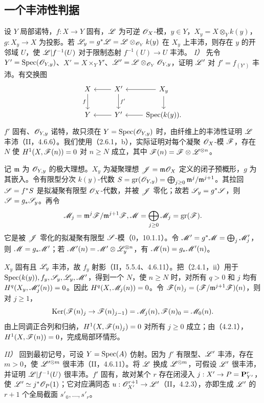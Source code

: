 \subsection{一个丰沛性判据}
设 $Y$ 局部诺特，$f:X\to Y$ 固有，$\mathscr L$ 为可逆 $\mathscr O_X$-模，$y\in Y$，$X_y=X\otimes_Yk(y)$，$g:X_y\to X$ 为投影。若 $\mathscr L_y=g^*\mathscr L=\mathscr L\otimes_{\mathscr O_Y}k(y)$ 在 $X_y$ 上丰沛，则存在 $y$ 的开邻域 $U$，使 $\mathscr L|f^{-1}(U)$ 对于限制态射 $f^{-1}(U)\to U$ 丰沛。
\eproof
\textit{I）} 先令 $Y'=\operatorname{Spec}(\mathscr O_{Y,y})$、$X'=X\times_YY'$、$\mathscr L'=\mathscr L\otimes_{\mathscr O_Y}\mathscr O_{Y,y}$，证明 $\mathscr L'$ 对 $f'=f_{(Y')}$ 丰沛。有交换图
\[
\begin{tikzcd}
X\arrow[d,"f"']&X'\arrow[l]\arrow[d,"f'"]&X_y\arrow[l]\arrow[d]\\
Y&Y'\arrow[l]&\Spec(k(y))\arrow[l].
\end{tikzcd}
\]
$f'$ 固有、$\mathscr O_{Y,y}$ 诺特，故只须在 $Y=\operatorname{Spec}(\mathscr O_{Y,y})$ 时，由纤维上的丰沛性证明 $\mathscr L$ 丰沛（II，4.6.6）。我们使用（2.6.1，b），实际证明对每个凝聚 $\mathscr O_X$-模 $\mathscr F$，存在 $N$ 使 $H^1(X,\mathscr F(n))=0$ 对 $n\ge N$ 成立，其中 $\mathscr F(n)=\mathscr F\otimes\mathscr L^{\otimes n}$。

记 $\mathfrak m$ 为 $\mathscr O_{Y,y}$ 的极大理想。$X_y$ 为凝聚理想 $\mathscr J=\mathfrak m\mathscr O_X$ 定义的闭子预概形，$g$ 为其嵌入。令有限型分次 $k(y)$-代数 $S=\operatorname{gr}(\mathscr O_{Y,y})=\bigoplus_{j\ge0}\mathfrak m^j/\mathfrak m^{j+1}$。其拉回 $\mathscr S=f^*S$ 是拟凝聚有限型 $\mathscr O_X$-代数，并被 $\mathscr J$ 零化；故若 $\mathscr S_y=g^*\mathscr S$，则 $\mathscr S=g_*\mathscr S_y$。再令
\[
\mathscr M_j=\mathfrak m^j\mathscr F/\mathfrak m^{j+1}\mathscr F, \mathscr M=\bigoplus_{j\ge0}\mathscr M_j=\operatorname{gr}(\mathscr F).
\]
它是被 $\mathscr J$ 零化的拟凝聚有限型 $\mathscr S$-模（0，10.1.1）。令 $\mathscr M'=g^*\mathscr M=\bigoplus_j\mathscr M'_j$，则 $\mathscr M=g_*\mathscr M'$；若 $\mathscr M'(n)=\mathscr M'\otimes\mathscr L_y^{\otimes n}$，有 $\mathscr M(n)=g_*\mathscr M'(n)$。

$X_y$ 固有且 $\mathscr L_y$ 丰沛，故 $f_y$ 射影（II，5.5.4、4.6.11）。把（2.4.1，ii）用于 $\operatorname{Spec}(k(y)),f_y,\mathscr S_y,\mathscr L_y,\mathscr M'$，得到一个 $N$，使 $n\ge N$ 时，对所有 $q>0$ 和 $j$ 均有 $H^q(X_y,\mathscr M'_j(n))=0$。因此 $H^q(X,\mathscr M_j(n))=0$。令 $\mathscr F(n)_j=(\mathscr F/\mathfrak m^{j+1}\mathscr F)(n)$，则对 $j\ge1$，
\[
\operatorname{Ker}(\mathscr F(n)_j\to\mathscr F(n)_{j-1})=\mathscr M_j(n), \mathscr F(n)_0=\mathscr M_0(n).
\]
由上同调正合列和归纳，$H^1(X,\mathscr F(n)_j)=0$ 对所有 $j\ge0$ 成立；由（4.2.1），$H^1(X,\mathscr F(n))=0$，完成局部环情形。

\textit{II）} 回到最初记号，可设 $Y=\operatorname{Spec}(A)$ 仿射。因为 $f'$ 有限型、$\mathscr L'$ 丰沛，存在 $m>0$，使 $\mathscr L'^{\otimes m}$ 很丰沛（II，4.6.11）。将 $\mathscr L$ 换成 $\mathscr L^{\otimes m}$，可假设 $\mathscr L'$ 很丰沛，并证明 $\mathscr L|f^{-1}(U)$ 很丰沛。$f'$ 固有，故对某个 $r$ 存在闭浸入 $j:X'\to P=\mathbf P^r_{Y'}$，使 $\mathscr L'\simeq j^*\mathscr O_P(1)$；它对应满同态 $u:\mathscr O_{X'}^{r+1}\to\mathscr L'$（II，4.2.3），亦即生成 $\mathscr L'$ 的 $r+1$ 个全局截面 $s'_0,\ldots,s'_r$。

